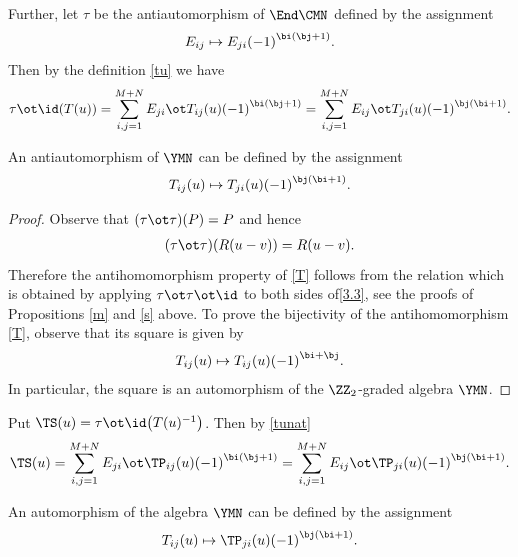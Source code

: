 Further, let $\tau$ be the antiautomorphism of $\End\CMN$
defined by the assignment
\begin{gather*}
E_{ij}\mapsto E_{ji} {(-1)}^{\bi ( \bj + 1)} .
\end{gather*}
Then by the definition \eqref{tu} we have
\begin{gather*}
\tau \ot\id ( T(u) )=
\sum_{i,j=1}^{M+N} E_{ji}\ot T_{ij}(u)
{(-1)}^{\bi ( \bj + 1)}=
\sum_{i,j=1}^{M+N} E_{ij}\ot T_{ji}(u)
{(-1)}^{\bj ( \bi + 1)} .
\end{gather*}

\begin{Proposition}
An antiautomorphism of %
$\YMN$ can be defined by the assignment
\begin{gather}
\label{T}
T_{ij}(u)\mapsto T_{ji}(u)
{(-1)}^{\bj ( \bi + 1)} .
\end{gather}
\end{Proposition}

\begin{proof}
Observe that $(\tau\ot\tau)(P)=P$ and hence
\begin{gather}
\label{Rtt}
(\tau\ot\tau)(R(u-v))=R(u-v) .
\end{gather}
Therefore the antihomomorphism property of \eqref{T}
follows from the relation which is obtained by applying
$\tau\ot\tau\ot\id$ to both sides of\eqref{3.3},
see the proofs of Propositions \ref{m} and \ref{s} above.
To prove the bijectivity of
the antihomomorphism \eqref{T}, observe
that its square is given by %
\begin{gather*}
T_{ij}(u)\mapsto T_{ij}(u)
{(-1)}^{\bi+ \bj} .
\end{gather*}
In particular, the square is an automorphism of the $\ZZ_2$-graded
algebra $\YMN $.
\end{proof}

Put
$\TS(u)=\tau \ot\id \big( T(u)^{-1} \big) $.
Then by \eqref{tunat}
\begin{gather}\label{tsu}
\TS(u)=
\sum_{i,j=1}^{M+N} E_{ji}\ot\TP_{ij}(u)
{(-1)}^{\bi ( \bj + 1)}=
\sum_{i,j=1}^{M+N} E_{ij}\ot\TP_{ji}(u)
{(-1)}^{\bj ( \bi + 1)} .
\end{gather}

\begin{Corollary}
\label{ts}
An automorphism of the algebra $\YMN$ can be defined by the assignment
\begin{gather}
\label{tusharp}
T_{ij}(u)\mapsto\TP_{ji}(u)
{(-1)}^{\bj ( \bi + 1)} .
\end{gather}
\end{Corollary}

